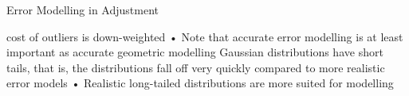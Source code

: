 \documentclass[10pt,landscape]{article}
\makeatletter
\renewcommand{\section}{\@startsection{section}{1}{0mm}%
                                {-1ex plus -.5ex minus -.2ex}%
                                {0.5ex plus .2ex}%
                                {\normalfont\large\bfseries}}
\renewcommand{\subsection}{\@startsection{subsection}{2}{0mm}%
                                {-1explus -.5ex minus -.2ex}%
                                {0.5ex plus .2ex}%
                                {\normalfont\normalsize\bfseries}}
\makeatother
\begin{document}
\begin{multicols}{3}
Error Modelling in Adjustment

cost of outliers is down-weighted
• Note that accurate error modelling is at least important as accurate geometric modelling
Gaussian distributions have short tails, that is, the distributions fall off very quickly compared to more realistic error models
• Realistic long-tailed distributions are more suited for modelling







 

\end{multicols}
\end{document}
